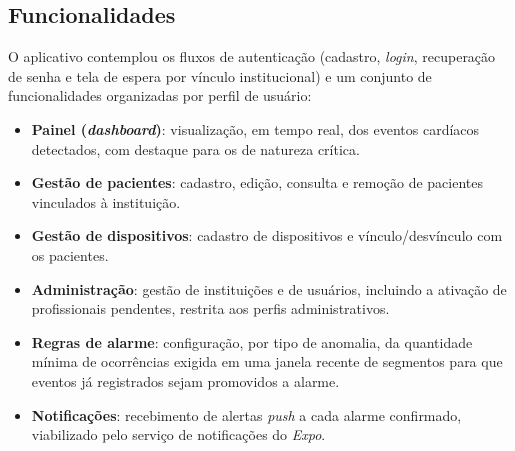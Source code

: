 \subsection{Funcionalidades}
\label{sec:appFunc}

O aplicativo contemplou os fluxos de autenticação (cadastro, \textit{login}, recuperação de senha e tela de espera por vínculo institucional) e um conjunto de funcionalidades organizadas por perfil de usuário:

\begin{itemize}
    \item \textbf{Painel (\textit{dashboard})}: visualização, em tempo real, dos eventos cardíacos detectados, com destaque para os de natureza crítica.
    \item \textbf{Gestão de pacientes}: cadastro, edição, consulta e remoção de pacientes vinculados à instituição.
    \item \textbf{Gestão de dispositivos}: cadastro de dispositivos e vínculo/desvínculo com os pacientes.
    \item \textbf{Administração}: gestão de instituições e de usuários, incluindo a ativação de profissionais pendentes, restrita aos perfis administrativos.
    \item \textbf{Regras de alarme}: configuração, por tipo de anomalia, da quantidade mínima de ocorrências exigida em uma janela recente de segmentos para que eventos já registrados sejam promovidos a alarme.
    \item \textbf{Notificações}: recebimento de alertas \textit{push} a cada alarme confirmado, viabilizado pelo serviço de notificações do \textit{Expo}.
\end{itemize}

